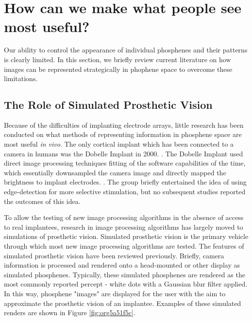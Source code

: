 \documentclass[a4paper,11pt,openany]{book}
\begin{document}
\clearpage

\chapter{How can we make what people see most useful?}
\label{sec:org9beda7d}
\label{orgdf1d92a}

Our ability to control the appearance of individual phosphenes and their patterns is clearly limited.
In this section, we briefly review current literature on how images can be represented strategically in phophene space to overcome these limitations.

\section*{The Role of Simulated Prosthetic Vision}
\label{sec:orgea84e6a}

Because of the difficulties of implanting electrode arrays, little research has been conducted on what methods of representing information in phosphene space are most useful \emph{in vivo}.
The only cortical implant which has been connected to a camera in humans was the Dobelle Implant in 2000. \cite{dobelle_artificial_2000}.
The Dobelle Implant used direct image processing techniques fitting of the software capabilities of the time, which essentially downsampled the camera image and directly mapped the brightness to implant electrodes. \cite{dobelle_artificial_2000}.
The group briefly entertained the idea of using edge-detection for more selective stimulation, but no subsequent studies reported the outcomes of this idea.

To allow the testing of new image processing algorithms in the absence of access to real implantees, research in image processing algorithms has largely moved to simulations of prosthetic vision. \cite{chen_simulating_2009-1,chen_simulating_2009}
Simulated prosthetic vision is the primary vehicle through which most new image processing algorithms are tested.
The features of simulated prosthetic vision have been reviewed previously. \cite{chen_simulating_2009-1}
Briefly, camera information is processed and rendered onto a head-mounted or other display as simulated phosphenes.
Typically, these simulated phosphenes are rendered as the most commonly reported percept - white dots with a Gaussian blur filter applied. \cite{chen_simulating_2009-1}
In this way, phosphene "images" are displayed for the user with the aim to approximate the prosthetic vision of an implantee.
Examples of these simulated renders are shown in Figure \ref{fig:org5a51f5c}.
\end{document}

